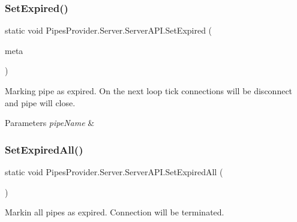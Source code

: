 \subsubsection{\texorpdfstring{Set\+Expired()}{SetExpired()}\hspace{0.1cm}{\footnotesize\ttfamily [2/2]}}
{\footnotesize\ttfamily static void Pipes\+Provider.\+Server.\+Server\+A\+P\+I.\+Set\+Expired (\begin{DoxyParamCaption}\item[{\mbox{\hyperlink{class_pipes_provider_1_1_server_1_1_server_transmission_controller}{Server\+Transmission\+Controller}}}]{meta }\end{DoxyParamCaption})\hspace{0.3cm}{\ttfamily [static]}}



Marking pipe as expired. On the next loop tick connections will be disconnect and pipe will close. 


\begin{DoxyParams}{Parameters}
{\em pipe\+Name} & \\
\hline
\end{DoxyParams}
\mbox{\label{class_pipes_provider_1_1_server_1_1_server_a_p_i_a6d6f42c39e7f5c8a63a026739fe0ea94}} 
\subsubsection{\texorpdfstring{Set\+Expired\+All()}{SetExpiredAll()}}
{\footnotesize\ttfamily static void Pipes\+Provider.\+Server.\+Server\+A\+P\+I.\+Set\+Expired\+All (\begin{DoxyParamCaption}{ }\end{DoxyParamCaption})\hspace{0.3cm}{\ttfamily [static]}}



Markin all pipes as expired. Connection will be terminated. 

\mbox{\label{class_pipes_provider_1_1_server_1_1_server_a_p_i_a44469667416cb072d8fd258b299a53cd}} 
